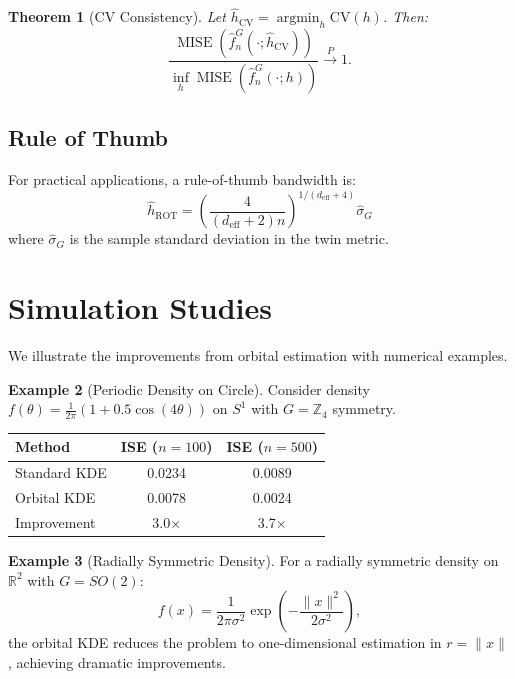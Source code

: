 \documentclass[11pt,twoside,openright]{book}
\theoremstyle{plain}
\newtheorem{theorem}{Theorem}[chapter]
\theoremstyle{definition}
\newtheorem{example}[theorem]{Example}
\theoremstyle{remark}
\newcommand{\Rd}{\mathbb{R}}
\newcommand{\Zd}{\mathbb{Z}}
\newcommand{\norm}[1]{\|#1\|}
\newcommand{\deff}{d_{\mathrm{eff}}}
\DeclareMathOperator{\argmin}{argmin}
\DeclareMathOperator{\MISE}{MISE}
\begin{document}
\begin{theorem}[CV Consistency]
\label{thm:cv-consistency}
Let $\hat{h}_{\text{CV}} = \argmin_h \text{CV}(h)$. Then:
\[
\frac{\MISE(\hat{f}_n^G(\cdot; \hat{h}_{\text{CV}}))}{\inf_h \MISE(\hat{f}_n^G(\cdot; h))} \xrightarrow{P} 1.
\]
\end{theorem}

\subsection{Rule of Thumb}

For practical applications, a rule-of-thumb bandwidth is:
\begin{equation}
\hat{h}_{\text{ROT}} = \left(\frac{4}{(\deff + 2)n}\right)^{1/(\deff+4)} \hat{\sigma}_G
\label{eq:rot-bandwidth}
\end{equation}
where $\hat{\sigma}_G$ is the sample standard deviation in the twin metric.

\section{Simulation Studies}

We illustrate the improvements from orbital estimation with numerical examples.

\begin{example}[Periodic Density on Circle]
Consider density $f(\theta) = \frac{1}{2\pi}(1 + 0.5\cos(4\theta))$ on $S^1$ with $G = \Zd_4$ symmetry.

\begin{center}
\begin{tabular}{lcc}
\toprule
Method & ISE ($n=100$) & ISE ($n=500$) \\
\midrule
Standard KDE & 0.0234 & 0.0089 \\
Orbital KDE & 0.0078 & 0.0024 \\
Improvement & 3.0$\times$ & 3.7$\times$ \\
\bottomrule
\end{tabular}
\end{center}
\end{example}

\begin{example}[Radially Symmetric Density]
For a radially symmetric density on $\Rd^2$ with $G = SO(2)$:
\[
f(x) = \frac{1}{2\pi\sigma^2} \exp\left(-\frac{\norm{x}^2}{2\sigma^2}\right),
\]
the orbital KDE reduces the problem to one-dimensional estimation in $r = \norm{x}$, achieving dramatic improvements.
\end{example}
\end{document}

